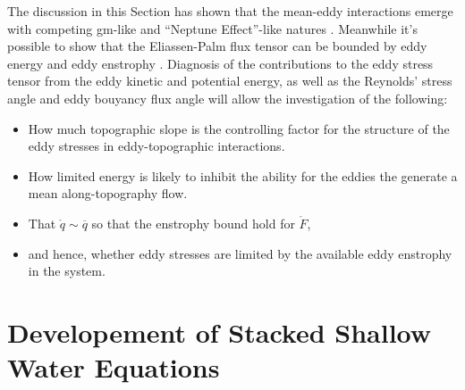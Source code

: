 \documentclass[10pt,a4paper]{report}
\newcommand*\thkmean[1]{\overline{#1}}
\newcommand*\spec[1]{\mathring{#1}}
\begin{document}
The discussion in this Section has shown that the mean-eddy interactions 
emerge with competing \gls{gm}-like and ``Neptune Effect''-like natures
\cite{adcock2000interactions}. Meanwhile  it's possible to show that
the Eliassen-Palm flux tensor can be bounded by eddy energy and eddy enstrophy
\cite{marshall2012framework}.
Diagnosis of the contributions to the eddy stress tensor from
the eddy kinetic and potential energy, as well as the Reynolds' stress angle and eddy bouyancy flux angle will allow the investigation of the following:
\begin{itemize} 
		\item How much topographic slope is the controlling factor for the structure of the eddy stresses in eddy-topographic interactions.
		\item How limited energy is likely to inhibit the ability for the eddies the
			generate a mean along-topography flow.
	    \item That $\spec{q} \sim \thkmean{q}$ so that the enstrophy bound hold for $\spec{F}$,
		\item and hence, whether eddy stresses are limited by the available eddy enstrophy in the system.
\end{itemize} 
 

\chapter{Developement of Stacked Shallow Water Equations}
\end{document}
